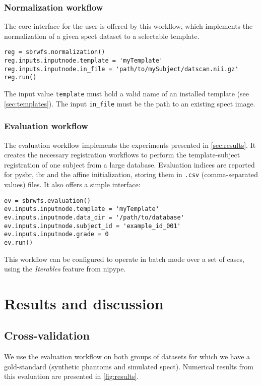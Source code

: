 \documentclass{frontiers}
\begin{document}
\subsubsection{Normalization workflow} %
The core interface for the user is offered by this workflow,
  which implements the normalization of a given \gls*{spect} 
  dataset to a selectable template.
\begin{lstlisting}[float,caption={\label{list:fullreg}Running a full template-subject registration}]
reg = sbrwfs.normalization()
reg.inputs.inputnode.template = 'myTemplate'
reg.inputs.inputnode.in_file = 'path/to/mySubject/datscan.nii.gz'
reg.run()
\end{lstlisting}
The input value \texttt{template} must hold a valid name of an installed 
  template (see \autoref{sec:templates}). 
The input \texttt{in\_file} must be the path to an existing \gls*{spect} image.

\subsubsection{Evaluation workflow} %
The evaluation workflow implements the experiments presented in \autoref{sec:results}. 
It creates the necessary registration workflows to perform the template-subject 
  registration of one subject from a large database.
Evaluation indices are reported for \gls*{pysbr}, \gls*{ibr} and the affine initialization,
  storing them in \texttt{.csv} (comma-separated values) files. 
It also offers a simple interface:
\begin{lstlisting}[float,caption={\label{list:fullev}Running the evaluation pipeline}]
ev = sbrwfs.evaluation()
ev.inputs.inputnode.template = 'myTemplate'
ev.inputs.inputnode.data_dir = '/path/to/database'
ev.inputs.inputnode.subject_id = 'example_id_001'
ev.inputs.inputnode.grade = 0
ev.run()
\end{lstlisting}

\noindent 
This workflow can be configured to operate in batch mode over a
  set of cases, using the \emph{Iterables} feature from \gls*{nipype}.

\section{Results and discussion}
\label{sec:results}

\subsection{Cross-validation}
\label{sec:results_test}
We use the evaluation workflow on both groups of datasets
  for which we have a gold-standard (synthetic phantoms and simulated \gls*{spect}).
Numerical results from this evaluation are presented in \autoref{fig:results}.
\end{document}
